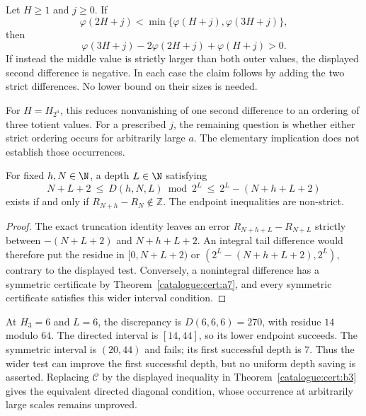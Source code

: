 \begin{prop}\label{prop:FR-01}
Let $H\ge1$ and $j\ge0$. If
\[
 \varphi(2H+j)<\min\{\varphi(H+j),\varphi(3H+j)\},
\]
then
\[
 \varphi(3H+j)-2\varphi(2H+j)+\varphi(H+j)>0.
\]
If instead the middle value is strictly larger than both outer values,
the displayed second difference is negative. In each case the claim
follows by adding the two strict differences. No lower bound on their
sizes is needed.

For $H=H_{2^a}$, this reduces nonvanishing of one second difference to an
ordering of three totient values. For a prescribed $j$, the remaining
question is whether either strict ordering occurs for arbitrarily large
$a$. The elementary implication does not establish those occurrences.
\end{prop}

\begin{prop}\label{prop:CP-06}
For fixed $h,N\in\N$, a depth $L\in\N$ satisfying
\[
 N+L+2\ \le\ D(h,N,L)\bmod2^L
 \ \le\ 2^L-(N+h+L+2)
\]
exists if and only if $R_{N+h}-R_N\notin\mathbb Z$.
The endpoint inequalities are non-strict.
\end{prop}

\begin{proof}
The exact truncation identity leaves an error $R_{N+h+L}-R_{N+L}$ strictly between
$-(N+L+2)$ and $N+h+L+2$. An integral tail difference would therefore
put the residue in $[0,N+L+2)$ or
$(2^L-(N+h+L+2),2^L)$, contrary to the displayed test.
Conversely, a nonintegral difference has a symmetric certificate by
Theorem~\ref{catalogue:cert:a7}, and every symmetric certificate
satisfies this wider interval condition.
\end{proof}

At $H_3=6$ and $L=6$, the discrepancy is $D(6,6,6)=270$,
with residue $14$ modulo $64$. The directed interval is $[14,44]$,
so its lower endpoint succeeds. The symmetric interval is $(20,44)$
and fails; its first successful depth is $7$. Thus the wider test
can improve the first successful depth, but no uniform depth saving
is asserted. Replacing $\mathcal C$ by the displayed inequality in
Theorem~\ref{catalogue:cert:b3} gives the equivalent directed diagonal
condition, whose occurrence at arbitrarily large scales remains unproved.

